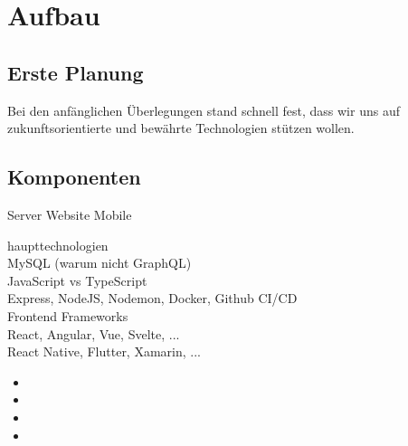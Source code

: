 \chapter{Aufbau}

\section{Erste Planung}
Bei den anfänglichen Überlegungen stand schnell fest, dass wir uns auf zukunftsorientierte und bewährte Technologien stützen wollen.

\section{Komponenten}
Server
Website
Mobile


haupttechnologien \\
MySQL (warum nicht GraphQL) \\
JavaScript vs TypeScript \\
Express, NodeJS, Nodemon, Docker, Github CI/CD \\

Frontend Frameworks \\
React, Angular, Vue, Svelte, ... \\
React Native, Flutter, Xamarin, ... \\


\begin{itemize}
    \item
    \item
    \item
    \item
\end{itemize}


